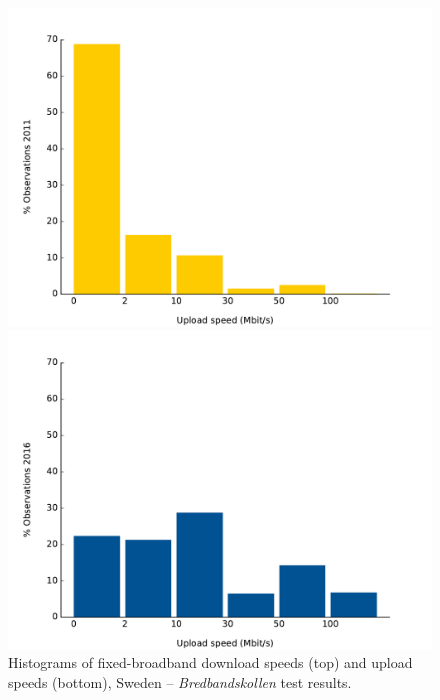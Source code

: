 \documentclass[12pt]{article}
\begin{document}
\begin{figure}[H]
    \begin{minipage}{0.5\textwidth}
        \centering
        \includegraphics[width=\textwidth]{histogram_upld_2011.pdf}
    \end{minipage}\hfill
    \begin{minipage}{0.5\textwidth}
        \centering
        \includegraphics[width=\textwidth]{histogram_upld_2016.pdf}
    \end{minipage}
    
        \caption{Histograms of fixed-broadband download speeds (top) and upload speeds (bottom), Sweden -- \textit{Bredbandskollen} test results.}
        \label{fig:a8}
\end{figure}   
\end{document}
